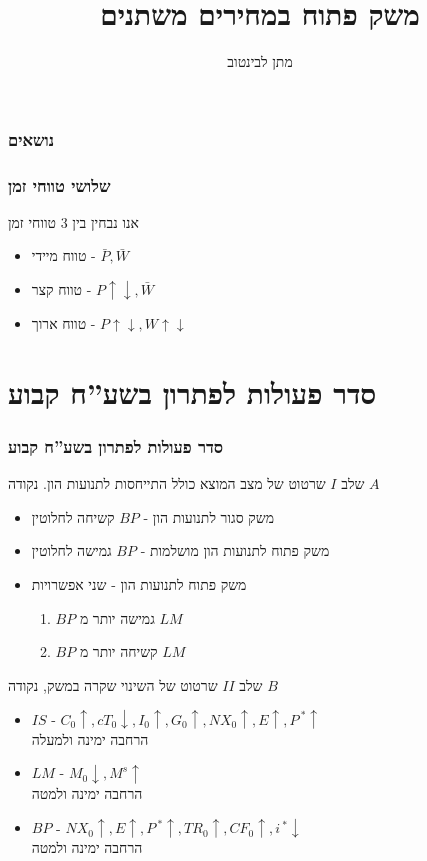 \documentclass[usenames,dvipsnames]{beamer}
\title[]{משק פתוח במחירים משתנים}
\author{מתן לבינטוב}
\institute[{{ אב"ג}}]{{ אוניברסיטת בן גוריון בנגב}}
\date{}
\begin{document}
\begin{RTL}
\begin{frame}
\titlepage
\end{frame}
\begin{frame}
    \frametitle{נושאים}
    \tableofcontents
    

\end{frame}


\begin{frame}
    \frametitle{שלושי טווחי זמן}
    אנו נבחין בין 3 טווחי זמן
    \begin{itemize}
        \item טווח מיידי - $\bar{P} , \bar{W}$
        \item טווח קצר - $P \uparrow \downarrow, \bar{W}$
        \item טווח ארוך - $P \uparrow \downarrow, W \uparrow \downarrow$
    \end{itemize}

    

\end{frame}

\section{סדר פעולות לפתרון בשע''ח קבוע}
\begin{frame}[allowframebreaks]
    \frametitle{סדר פעולות לפתרון בשע''ח קבוע}
    \begin{block}{שלב $I$}
        שרטוט של מצב המוצא כולל התייחסות לתנועות הון. נקודה $A$
        \begin{itemize}
            \item משק סגור לתנועות הון - $BP$ קשיחה לחלוטין
            \item משק פתוח לתנועות הון מושלמות - $BP$ גמישה לחלוטין
            \item משק פתוח לתנועות הון - שני אפשרויות
            \begin{enumerate}
                \item $BP$ גמישה יותר מ $LM$
                \item $BP$ קשיחה יותר מ $LM$
            \end{enumerate}
        \end{itemize}
    \end{block}

    \begin{block}{שלב $II$}
        שרטוט של השינוי שקרה במשק, נקודה $B$
        \begin{itemize}
            \item $IS$ - $C_0 \uparrow ,cT_0 \downarrow ,I_0 \uparrow ,G_0 \uparrow ,NX_0 \uparrow ,E \uparrow ,P^{\ *} \uparrow$ \\ הרחבה ימינה ולמעלה
            \item $LM$ - $M_0 \downarrow , M^s \uparrow$ \\ הרחבה ימינה ולמטה
            \item $BP$ - $NX_0 \uparrow , E \uparrow , P^{\ *} \uparrow , TR_0 \uparrow, CF_0 \uparrow, i^{\ *} \downarrow$ \\ הרחבה ימינה ולמטה
        \end{itemize}
    \end{block}
    

\end{frame}
\end{RTL}
\end{document}
